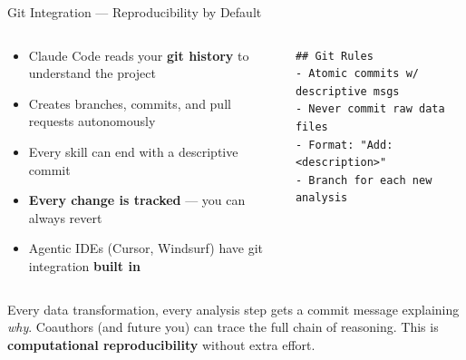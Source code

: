 \documentclass[aspectratio=169, 11pt]{beamer}
\newcommand{\emphgold}[1]{\alert{\textbf{#1}}}
\begin{document}
\begin{frame}[fragile,shrink=20]{Git Integration --- Reproducibility by Default}
\begin{columns}[T]
\begin{keyinsight}
\begin{itemize}
  \item Claude Code reads your \emphgold{git history} to understand the project
  \item Creates branches, commits, and pull requests autonomously
  \item Every skill can end with a descriptive commit
  \item \emphgold{Every change is tracked} --- you can always revert
  \item Agentic IDEs (Cursor, Windsurf) have git integration \emphgold{built in}
\end{itemize}
\end{keyinsight}

\begin{keyinsight}
\begin{codeblock}
\scriptsize
\begin{verbatim}
## Git Rules
- Atomic commits w/ descriptive msgs
- Never commit raw data files
- Format: "Add: <description>"
- Branch for each new analysis
\end{verbatim}
\end{codeblock}
\end{keyinsight}
\end{columns}
\vspace{0.2cm}
\begin{warningbox}
Every data transformation, every analysis step gets a commit message explaining \emph{why}. Coauthors (and future you) can trace the full chain of reasoning. This is \emphgold{computational reproducibility} without extra effort.
\end{warningbox}
\end{frame}
\end{document}
